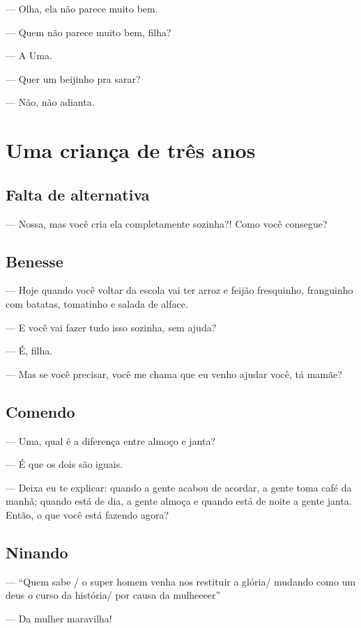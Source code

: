 {— Olha, ela não parece muito bem.

— Quem não parece muito bem, filha?

— A Uma.

— Quer um beijinho pra sarar?

— Não, não adianta.

  \part{Uma criança de três anos}

\chapter{Falta de alternativa}

— Nossa, mas você cria ela completamente sozinha?! Como você consegue?

\chapter{Benesse}

— Hoje quando você voltar da escola vai ter arroz e feijão fresquinho,
franguinho com batatas, tomatinho e salada de alface.

— E você vai fazer tudo isso sozinha, sem ajuda?

— É, filha.

— Mas se você precisar, você me chama que eu venho ajudar você, tá
mamãe?

\chapter{Comendo}

— Uma, qual é a diferença entre almoço e janta?

— É que os dois são iguais.

— Deixa eu te explicar: quando a gente acabou de acordar, a gente toma
café da manhã; quando está de dia, a gente almoça e quando está de noite
a gente janta. Então, o que você está fazendo agora?

\chapter{Ninando}

— ``Quem sabe / o super homem venha nos restituir a glória/ mudando como
um deus o curso da história/ por causa da mulheeeer''

— Da mulher maravilha!

}

